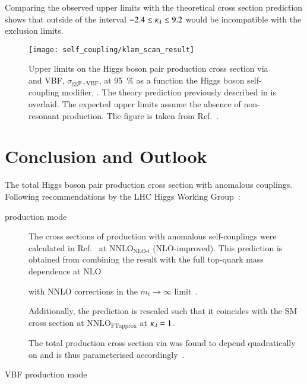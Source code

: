 Comparing the observed upper limits with the theoretical cross section
prediction shows that \klambda outside of the interval
$-2.4 \leq \kappa_{\lambda} \leq 9.2$ would be incompatible with the exclusion
limits.


\begin{figure}[htbp]
  \centering

  \texttt{[image: self\_coupling/klam\_scan\_result]}

  \caption{Upper limits on the Higgs boson pair production cross
    section via \ggF and VBF, $\sigma_{\text{ggF+VBF}}$, at
    \SI{95}{\percent} \CLs as a function the Higgs boson self-coupling
    modifier, \klambda. The theory prediction previously described in
     is overlaid. The expected upper limits
    assume the absence of non-resonant \HH production. The figure is
    taken from Ref.~\cite{ATLAS-CONF-2021-052}.}%
  \label{fig:klambda_scan}
\end{figure}


\section{Conclusion and Outlook}%
\label{sec:reinterpretation_conclusion}


The total Higgs boson pair production cross section with anomalous
couplings. Following recommendations by the LHC Higgs Working
Group~\cite{LHCHWGHH}:
\begin{description}

\item[\ggF production mode] The cross sections of \HH production with
  anomalous self-couplings were calculated in
  Ref.~\cite{Amoroso:2020lgh} at $\text{NNLO}_{\text{NLO-i}}$
  (NLO-improved). This prediction is obtained from combining the
  result with the full top-quark mass dependence at
  NLO~\cite{Buchalla:2018yce}


  with NNLO corrections in the $m_{t} \to \infty$
  limit~\cite{deFlorian:2017qfk}.

  Additionally, the prediction is rescaled such that it coincides with
  the SM \HH cross section at $\text{NNLO}_{\text{FTapprox}}$ at
  $\kappa_{\lambda} = 1$.

  The total \HH production cross section via \ggF was found to depend
  quadratically on \klambda and is thus parameterised
  accordingly~\cite{LHCHWGHH}.

\item[VBF production mode]

\end{description}


